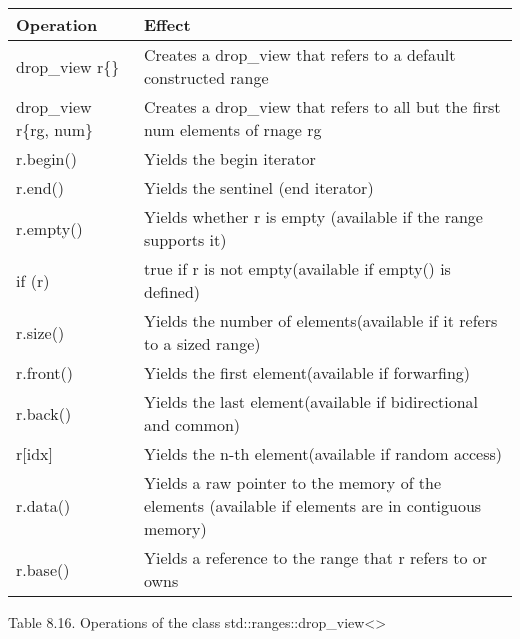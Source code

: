 \begin{longtable}[c]{|l|l|}
\hline
\textbf{Operation} & \textbf{Effect}                                                        \\ \hline
\endfirsthead
%
\endhead
%
drop\_view r\{\}   & Creates a drop\_view that refers to a default constructed range        \\ \hline
drop\_view r\{rg, num\} & Creates a drop\_view that refers to all but the first num elements of rnage rg                      \\ \hline
r.begin()          & Yields the begin iterator                                              \\ \hline
r.end()            & Yields the sentinel (end iterator)                                     \\ \hline
r.empty()          & Yields whether r is empty (available if the range supports it)         \\ \hline
if (r)             & true if r is not empty(available if empty() is defined)                \\ \hline
r.size()           & Yields the number of elements(available if it refers to a sized range) \\ \hline
r.front()          & Yields the first element(available if forwarfing)                      \\ \hline
r.back()           & Yields the last element(available if bidirectional and common)         \\ \hline
r{[}idx{]}         & Yields the n-th element(available if random access)                    \\ \hline
r.data()                & Yields a raw pointer to the memory of the elements (available if elements are in contiguous memory) \\ \hline
r.base()           & Yields a reference to the range that r refers to or owns               \\ \hline
\end{longtable}

\begin{center}
Table 8.16. Operations of the class std::ranges::drop\_view<>
\end{center}


